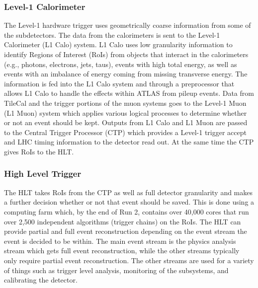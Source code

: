 \subsubsection{Level-1 Calorimeter}
The Level-1 hardware trigger uses geometrically coarse information from some of the subdetectors.  The data from the calorimeters is sent to the Level-1 Calorimeter (L1 Calo) system.  L1 Calo uses low granularity information to identify Regions of Interest (RoIs) from objects that interact in the calorimeters (e.g., photons, electrons, jets, taus), events with high total energy, as well as events with an imbalance of energy coming from missing transverse energy.  The information is fed into the L1 Calo system and through a preprocessor that allows L1 Calo to handle the effects within ATLAS from pileup events.
Data from TileCal and the trigger portions of the muon systems goes to the Level-1 Muon (L1 Muon) system which applies various logical processes to determine whether or not an event should be kept.  
Outputs from L1 Calo and L1 Muon are passed to the Central Trigger Processor (CTP) which provides a Level-1 trigger accept and LHC timing information to the detector read out.  At the same time the CTP gives RoIs to the HLT.

\subsubsection{High Level Trigger}
The HLT takes RoIs from the CTP as well as full detector granularity and makes a further decision whether or not that event should be saved.  This is done using a computing farm which, by the end of Run 2, contains over 40,000 cores that run over 2,500 independent algorithms (trigger chains) on the RoIs.  The HLT can provide partial and full event reconstruction depending on the event stream the event is decided to be within.  The main event stream is the physics analysis stream which gets full event reconstruction, while the other streams typically only require partial event reconstruction.  The other streams are used for a variety of things such as trigger level analysis, monitoring of the subsystems, and calibrating the detector.














